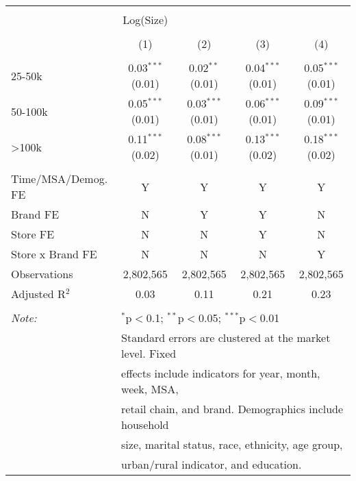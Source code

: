 
\begin{table}[!htbp] \centering 
  \caption{} 
  \label{tab:packageSizeFull7245} 
\begin{tabular}{@{\extracolsep{5pt}}lcccc} 
\\[-1.8ex]\hline 
\hline \\[-1.8ex] 
 & Log(Size) &  &  &  \\ 
\\[-1.8ex] & (1) & (2) & (3) & (4)\\ 
\hline \\[-1.8ex] 
 25-50k & 0.03$^{***}$ (0.01) & 0.02$^{**}$ (0.01) & 0.04$^{***}$ (0.01) & 0.05$^{***}$ (0.01) \\ 
  50-100k & 0.05$^{***}$ (0.01) & 0.03$^{***}$ (0.01) & 0.06$^{***}$ (0.01) & 0.09$^{***}$ (0.01) \\ 
  >100k & 0.11$^{***}$ (0.02) & 0.08$^{***}$ (0.01) & 0.13$^{***}$ (0.02) & 0.18$^{***}$ (0.02) \\ 
 \hline \\[-1.8ex] 
Time/MSA/Demog. FE & Y & Y & Y & Y \\ 
Brand FE & N & Y & Y & N \\ 
Store FE & N & N & Y & N \\ 
Store x Brand FE & N & N & N & Y \\ 
Observations & 2,802,565 & 2,802,565 & 2,802,565 & 2,802,565 \\ 
Adjusted R$^{2}$ & 0.03 & 0.11 & 0.21 & 0.23 \\ 
\hline 
\hline \\[-1.8ex] 
\textit{Note:}  & \multicolumn{4}{l}{$^{*}$p$<$0.1; $^{**}$p$<$0.05; $^{***}$p$<$0.01} \\ 
 & \multicolumn{4}{l}{Standard errors are clustered at the market level. Fixed } \\ 
 & \multicolumn{4}{l}{effects include indicators for year, month, week, MSA, } \\ 
 & \multicolumn{4}{l}{retail chain, and brand. Demographics include household } \\ 
 & \multicolumn{4}{l}{size, marital status, race, ethnicity, age group, } \\ 
 & \multicolumn{4}{l}{urban/rural indicator, and education.} \\ 
\end{tabular} 
\end{table} 
